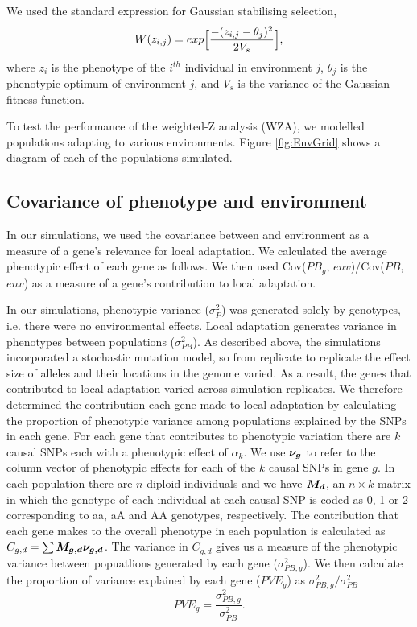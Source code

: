 \documentclass[11pt,twoside,lineno]{GSA_format}
\newcommand{\bm}[1]{\mbox{\boldmath{$#1$}}}
\begin{document}
We used the standard expression for Gaussian stabilising selection,
\begin{equation}
\notag
W(z_{i,j}) = exp \Big[\frac{-(z_{i,j} - \theta_j)^2}{2V_s}\Big],
\end{equation}
where $z_i$ is the phenotype of the $i^{th}$ individual in environment $j$, $\theta_j$ is the phenotypic optimum of environment $j$, and $V_s$ is the variance of the Gaussian fitness function. 

To test the performance of the weighted-Z analysis (WZA), we modelled populations adapting to various environments. Figure \ref{fig:EnvGrid} shows a diagram of each of the populations simulated.


\subsection{Covariance of phenotype and environment} 

In our simulations, we used the covariance between  and environment as a measure of a gene's relevance for local adaptation. We calculated the average phenotypic effect of each gene as follows.
We then used Cov($PB_g$, $env$)/Cov($PB$, $env$) as a measure of a gene's contribution to local adaptation.


In our simulations, phenotypic variance ($\sigma^{2}_{P}$) was generated solely by genotypes, i.e. there were no environmental effects. Local adaptation generates variance in phenotypes between populations ($\sigma^{2}_{PB}$). 
As described above, the simulations incorporated a stochastic mutation model, so from replicate to replicate the effect size of alleles and their locations in the genome varied. As a result, the genes that contributed to local adaptation varied across simulation replicates. We therefore determined the contribution  each gene made to local adaptation by calculating the proportion of phenotypic variance among populations explained by the SNPs in each gene. For each gene that contributes to phenotypic variation there are $k$ causal SNPs each with a phenotypic effect of $\alpha_k$. We use $\bm{\nu_g}$ to refer to the column vector of phenotypic effects for each of the $k$ causal SNPs in gene $g$. In each population there are $n$ diploid individuals and we have $\bm{M_d}$, an $n \times k$ matrix in which the genotype of each individual at each causal SNP is coded as 0, 1 or 2 corresponding to aa, aA and AA genotypes, respectively. The contribution that each gene makes to the overall phenotype in each population is calculated as $C_{g,d} = \sum \bm{M_{g,d} \nu_{g,d}}$. The variance in $C_{g,d}$ gives us a measure of the phenotypic variance between popuatlions generated by each gene ($\sigma^{2}_{PB,g}$). We then calculate the proportion of variance explained by each gene ($PVE_g$) as $\sigma^{2}_{PB,g} / \sigma^{2}_{PB}$
\begin{equation}
PVE_g = \frac{\sigma^{2}_{PB,g}}{\sigma^{2}_{PB}}.
\end{equation}
\end{document}
